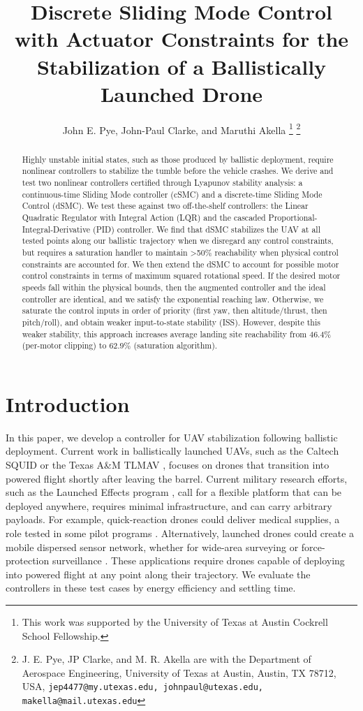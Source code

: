 \documentclass[conf]{new-aiaa}
\title{Discrete Sliding Mode Control with Actuator Constraints for the Stabilization of a Ballistically Launched Drone}
\author{John E. Pye, John-Paul Clarke, and Maruthi Akella%
\footnote{This work was supported by the University of Texas at Austin Cockrell School Fellowship.}%
\footnote{J. E. Pye, JP Clarke, and M. R. Akella are with the Department of Aerospace Engineering, University of Texas at Austin, Austin, TX 78712, USA,
{\tt\small jep4477@my.utexas.edu, johnpaul@utexas.edu, makella@mail.utexas.edu}}}
\affil{Department of Aerospace Engineering, University of Texas at Austin, Austin, TX 78712, USA}
\begin{document}
\maketitle

\begin{abstract}
Highly unstable initial states, such as those produced by ballistic deployment, require nonlinear controllers to stabilize the tumble before the vehicle crashes. We derive and test two nonlinear controllers certified through Lyapunov stability analysis: a continuous-time Sliding Mode controller (cSMC) and a discrete-time Sliding Mode Control (dSMC). We test these against two off-the-shelf controllers: the Linear Quadratic Regulator with Integral Action (LQR) and the cascaded Proportional-Integral-Derivative (PID) controller. We find that dSMC stabilizes the UAV at all tested points along our ballistic trajectory when we disregard any control constraints, but requires a saturation handler to maintain >50\% reachability when physical control constraints are accounted for. We then extend the dSMC to account for possible motor control constraints in terms of maximum squared rotational speed. If the desired motor speeds fall within the physical bounds, then the augmented controller and the ideal controller are identical, and we satisfy the exponential reaching law. Otherwise, we saturate the control inputs in order of priority (first yaw, then altitude/thrust, then pitch/roll), and obtain weaker input-to-state stability (ISS). However, despite this weaker stability, this approach increases average landing site reachability from $46.4\%$ (per-motor clipping) to $62.9\%$ (saturation algorithm).
\end{abstract}
\section{Introduction}
In this paper, we develop a controller for UAV stabilization following ballistic deployment. Current work in ballistically launched UAVs, such as the Caltech SQUID \cite{refs:Bouman2019} or the Texas A\&M TLMAV \cite{refs:Denton2025}, focuses on drones that transition into powered flight shortly after leaving the barrel. Current military research efforts, such as the Launched Effects program \cite{refs:Harper2025}, call for a flexible platform that can be deployed anywhere, requires minimal infrastructure, and can carry arbitrary payloads. For example, quick-reaction drones could deliver medical supplies, a role tested in some pilot programs \cite{refs:Starks2024}. Alternatively, launched drones could create a mobile dispersed sensor network, whether for wide-area surveying \cite{refs:Liang2019} or force-protection surveillance \cite{refs:Michelena2025}. These applications require drones capable of deploying into powered flight at any point along their trajectory. We evaluate the controllers in these test cases by energy efficiency and settling time.
\end{document}
